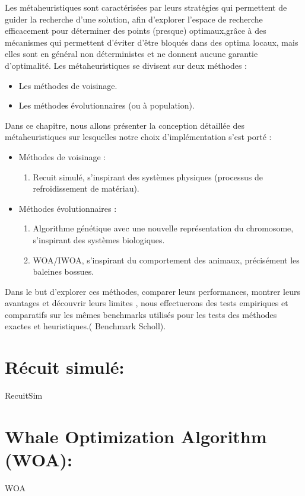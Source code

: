\documentclass[12pt,a4paper, titlepage]{report}
\begin{document}
    Les métaheuristiques sont caractérisées par leurs stratégies qui permettent de guider la recherche d’une solution, afin d’explorer l’espace de recherche efficacement pour déterminer des points (presque) optimaux,grâce à des mécanismes qui permettent d’éviter d'être bloqués dans des optima locaux, mais elles sont en général non déterministes et ne donnent aucune garantie d’optimalité.
    Les métaheuristiques se divisent sur deux méthodes :
    \begin{itemize}
        \item Les méthodes de voisinage.
        \item Les méthodes évolutionnaires (ou à population).
    \end{itemize}
    Dans ce chapitre, nous allons présenter la conception détaillée des métaheuristiques sur lesquelles notre choix d’implémentation s’est porté :
    \begin{itemize}
        \item Méthodes de voisinage :
            \begin{enumerate}
                \item Recuit simulé, s’inspirant des systèmes physiques (processus de refroidissement de matériau).
            \end{enumerate}
        \item Méthodes évolutionnaires :
            \begin{enumerate}
                \item Algorithme génétique avec une nouvelle représentation du chromosome, s’inspirant des systèmes biologiques.
                \item WOA/IWOA, s’inspirant du comportement des animaux, précisément les baleines bossues.
            \end{enumerate}
    \end{itemize}
    Dans le but d’explorer ces méthodes, comparer leurs performances, montrer leurs avantages et découvrir leurs limites , nous effectuerons des tests empiriques et comparatifs sur les mêmes  benchmarks utilisés pour les tests des méthodes exactes et heuristiques.( Benchmark Scholl).
    \chapter{Récuit simulé: }
    {RecuitSim}
    \chapter{Whale Optimization Algorithm (WOA): }
    {WOA}
\end{document}
